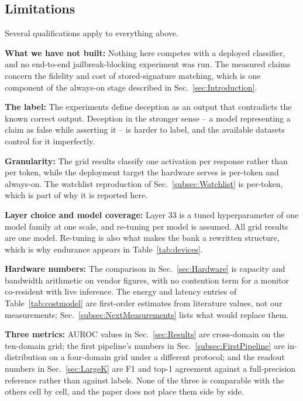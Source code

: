 \documentclass[conference]{IEEEtran}
\newcommand{\auroc}{{AUROC}\xspace}
\begin{document}
\subsection{Limitations}
\label{subsec:Limitations}
Several qualifications apply to everything above.

\textbf{What we have not built:} Nothing here competes with a deployed
classifier, and no end-to-end jailbreak-blocking experiment was run. The
measured claims concern the fidelity and cost of stored-signature
matching, which is one component of the always-on stage described in
Sec.~\ref{sec:Introduction}.

\textbf{The label:} The experiments define deception as an output that
contradicts the known correct output. Deception in the stronger sense --
a model representing a claim as false while asserting it -- is harder to
label, and the available datasets control for it imperfectly.

\textbf{Granularity:} The grid results classify one activation per
response rather than per token, while the deployment target the hardware
serves is per-token and always-on. The watchlist reproduction of
Sec.~\ref{subsec:Watchlist} is per-token, which is part of why it is
reported here.

\textbf{Layer choice and model coverage:} Layer 33 is a tuned
hyperparameter of one model family at one scale, and re-tuning per model
is assumed. All grid results are one model. Re-tuning is also what makes
the bank a rewritten structure, which is why endurance appears in
Table~\ref{tab:devices}.

\textbf{Hardware numbers:} The comparison in Sec.~\ref{sec:Hardware} is
capacity and bandwidth arithmetic on vendor figures, with no contention
term for a monitor co-resident with live inference. The energy and
latency entries of Table~\ref{tab:costmodel} are first-order estimates
from literature values, not our measurements;
Sec.~\ref{subsec:NextMeasurements} lists what would replace them.

\textbf{Three metrics:} \auroc values in Sec.~\ref{sec:Results} are
cross-domain on the ten-domain grid; the first pipeline's numbers in
Sec.~\ref{subsec:FirstPipeline} are in-distribution on a four-domain
grid under a different protocol; and the readout numbers in
Sec.~\ref{sec:LargeK} are F1 and top-1 agreement against a
full-precision reference rather than against labels. None of the three is
comparable with the others cell by cell, and the paper does not place
them side by side.
\end{document}
